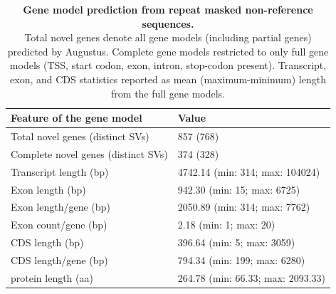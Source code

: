 \documentclass[../main.tex]{subfiles}
\begin{document}
\begin{flushleft}
\begin{landscape}
    \begin{table}
        \caption[Gene model predictions]{\textbf{Gene model prediction from repeat masked non-reference sequences.} \\
        \small{Total novel genes denote all gene models (including partial genes) predicted by Augustus. Complete gene models restricted to only full gene models (TSS, start codon, exon, intron, stop-codon present). Transcript, exon, and CDS statistics reported as mean (maximum-minimum) length from the full gene models.}}
        \bigskip
        \bigskip
        \centering
        \label{sup_tab:s42}
        \begin{tabular}{|l|l|}
        \hline
        \textbf{Feature of the gene model}~ & \textbf{Value}                     \\
        \hline
        Total novel genes (distinct SVs)    & 857 (768)                          \\
        \hline
        Complete novel genes (distinct SVs) & 374 (328)                          \\
        \hline
        Transcript length (bp)              & 4742.14 (min: 314; max: 104024)    \\
        \hline
        Exon length (bp)                    & 942.30 (min: 15; max: 6725)        \\
        \hline
        Exon length/gene (bp)               & 2050.89 (min: 314; max: 7762)      \\
        \hline
        Exon count/gene (bp)                & 2.18 (min: 1; max: 20)             \\
        \hline
        CDS length (bp)                     & 396.64 (min: 5; max: 3059)         \\
        \hline
        CDS length/gene (bp)                & 794.34 (min: 199; max: 6280)       \\
        \hline
        protein length (aa)                 & 264.78 (min: 66.33; max: 2093.33)  \\
        \hline
        \end{tabular}
    \end{table}
\end{landscape}



\end{flushleft}
\end{document}
